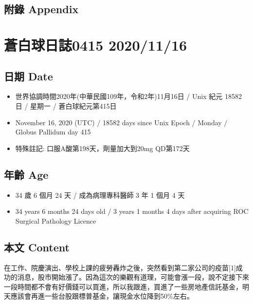 \documentclass[
]{article}
\providecommand{\tightlist}{%
  \setlength{\itemsep}{0pt}\setlength{\parskip}{0pt}}
\begin{document}
\hypertarget{ux9644ux9304-appendix-11}{%
\subsection{附錄 Appendix}\label{ux9644ux9304-appendix-11}}

\hypertarget{ux84bcux767dux7403ux65e5ux8a8c0415-20201116}{%
\section{蒼白球日誌0415
2020/11/16}\label{ux84bcux767dux7403ux65e5ux8a8c0415-20201116}}

\hypertarget{ux65e5ux671f-date-12}{%
\subsection{日期 Date}\label{ux65e5ux671f-date-12}}

\begin{itemize}
\tightlist
\item
  世界協調時間2020年(中華民國109年，令和2年)11月16日 / Unix 紀元 18582
  日 / 星期一 / 蒼白球紀元第415日
\item
  November 16, 2020 (UTC) / 18582 days since Unix Epoch / Monday /
  Globus Pallidum day 415
\item
  特殊註記: 口服A酸第198天，劑量加大到20mg QD第172天
\end{itemize}

\hypertarget{ux5e74ux9f61-age-12}{%
\subsection{年齡 Age}\label{ux5e74ux9f61-age-12}}

\begin{itemize}
\tightlist
\item
  34 歲 6 個月 24 天 / 成為病理專科醫師 3 年 1 個月 4 天
\item
  34 years 6 months 24 days old / 3 years 1 months 4 days after
  acquiring ROC Surgical Pathology Licence
\end{itemize}

\hypertarget{ux672cux6587-content-12}{%
\subsection{本文 Content}\label{ux672cux6587-content-12}}

在工作、院慶演出、學校上課的疲勞轟炸之後，突然看到第二家公司的疫苗{[}1{]}成功的消息，股市開始漲了。因為這次的樂觀有道理，可能會漲一段，說不定接下來一段時間都不會有好價錢可以買進，所以我跟進，買進了一些房地產信託基金，明天應該會再進一些台股跟標普基金，讓現金水位降到50\%左右。
\end{document}
